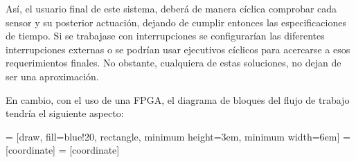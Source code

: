 Así, el usuario final de este sistema, deberá de manera cíclica comprobar cada sensor y su posterior actuación, dejando de cumplir entonces las especificaciones de tiempo. \newline
Si se trabajase con interrupciones se configurarían las diferentes interrupciones externas o se podrían usar ejecutivos cíclicos para acercarse a esos requerimientos finales. No obstante, cualquiera de estas soluciones, no dejan de ser una aproximación.\newline

En cambio, con el uso de una FPGA, el diagrama de bloques del flujo de trabajo tendría el siguiente aspecto:

 = [draw, fill=blue!20, rectangle, 
minimum height=3em, minimum width=6em]
 = [coordinate]
 = [coordinate]
\begin{center}

\end{center}

\begin{center}
\end{center}

